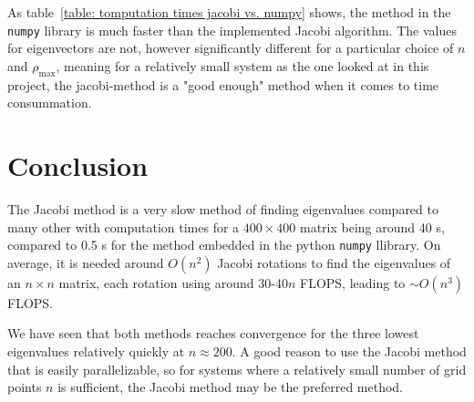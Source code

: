 \documentclass[11pt, a4paper]{article}
\begin{document}
			As table~\ref{table: tomputation times jacobi vs. numpy} shows, the method in the \texttt{numpy} library is much faster than the implemented Jacobi algorithm. The values for eigenvectors are not, however significantly different for a particular choice of $n$ and $\rho_\mathrm{max}$, meaning for a relatively small system as the one looked at in this project, the jacobi-method is a "good enough" method when it comes to time consummation. 
		
	\section{Conclusion}
		The Jacobi method is a very slow method of finding eigenvalues compared to many other with computation times for a $400\times400$ matrix being around 40 s, compared to 0.5 s for the method embedded in the python \texttt{numpy} llibrary. On average, it is needed around $O(n^2)$ Jacobi rotations to find the eigenvalues of an $n\times n$ matrix, each rotation using around 30-40$n$ FLOPS, leading to $\sim O(n^3)$ FLOPS. 
		
		We have seen that both methods reaches convergence for the three lowest eigenvalues relatively quickly at $n\approx 200$. A good reason to use the Jacobi method that is easily parallelizable, so for systems where a relatively small number of grid points $n$ is sufficient, the Jacobi method may be the preferred method.
		
	
\end{document}

